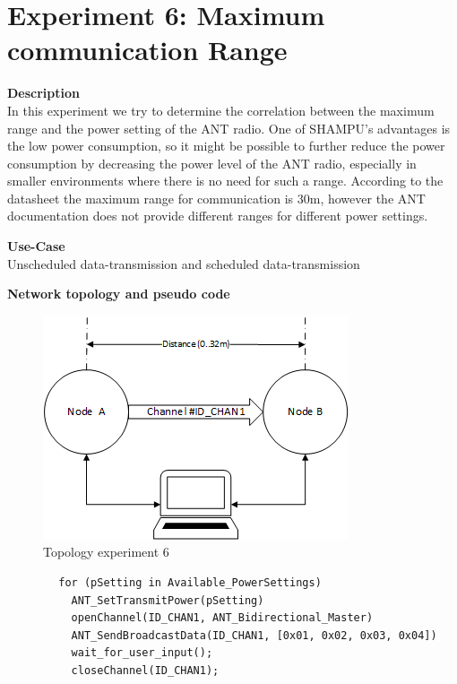 \section{Experiment 6: Maximum communication Range}
\begin{description} 
	\item{\textbf{Description}} \hfill \\  In this experiment we try to determine the correlation between the maximum range and the power setting of the ANT radio. One of SHAMPU's advantages is the low power consumption, so it might be possible to further reduce the power consumption by decreasing the power level of the ANT radio, especially in smaller environments where there is no need for such a range. According to the datasheet the maximum range for communication is 30m, however the ANT documentation does not provide different ranges for different power settings. 
	
	\item{\textbf{Use-Case}} \hfill \\ Unscheduled data-transmission and scheduled data-transmission	
	\item{\textbf{Network topology and pseudo code}} \hfill \\ 
	\begin{figure}[H]
		\centering
		\includegraphics[scale=1]{content/images/exp6_topo.png}
		\caption{Topology experiment 6}
	\end{figure}
	
	\begin{code}[H]
		\begin{verbatim}
		for (pSetting in Available_PowerSettings)
		  ANT_SetTransmitPower(pSetting)
		  openChannel(ID_CHAN1, ANT_Bidirectional_Master)
		  ANT_SendBroadcastData(ID_CHAN1, [0x01, 0x02, 0x03, 0x04])
		  wait_for_user_input();
		  closeChannel(ID_CHAN1);
		\end{verbatim}
		\caption{Maximum communication range (Master)}\label{lst:mExp6}
	\end{code}
	

\end{description}
